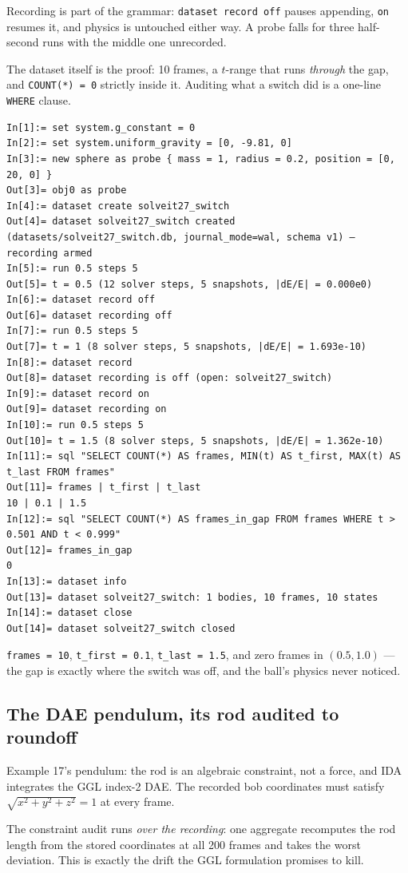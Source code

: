 \documentclass[11pt]{article}
\newcommand{\code}[1]{\texttt{#1}}
\begin{document}
Recording is part of the grammar: \code{dataset record off} pauses
appending, \code{on} resumes it, and physics is untouched either way.
A probe falls for three half-second runs with the middle one
unrecorded.

The dataset itself is the proof: 10 frames, a $t$-range that runs
\emph{through} the gap, and \code{COUNT(*) = 0} strictly inside it.
Auditing what a switch did is a one-line \code{WHERE} clause.

\begin{lstlisting}
In[1]:= set system.g_constant = 0
In[2]:= set system.uniform_gravity = [0, -9.81, 0]
In[3]:= new sphere as probe { mass = 1, radius = 0.2, position = [0, 20, 0] }
Out[3]= obj0 as probe
In[4]:= dataset create solveit27_switch
Out[4]= dataset solveit27_switch created (datasets/solveit27_switch.db, journal_mode=wal, schema v1) — recording armed
In[5]:= run 0.5 steps 5
Out[5]= t = 0.5 (12 solver steps, 5 snapshots, |dE/E| = 0.000e0)
In[6]:= dataset record off
Out[6]= dataset recording off
In[7]:= run 0.5 steps 5
Out[7]= t = 1 (8 solver steps, 5 snapshots, |dE/E| = 1.693e-10)
In[8]:= dataset record
Out[8]= dataset recording is off (open: solveit27_switch)
In[9]:= dataset record on
Out[9]= dataset recording on
In[10]:= run 0.5 steps 5
Out[10]= t = 1.5 (8 solver steps, 5 snapshots, |dE/E| = 1.362e-10)
In[11]:= sql "SELECT COUNT(*) AS frames, MIN(t) AS t_first, MAX(t) AS t_last FROM frames"
Out[11]= frames | t_first | t_last
10 | 0.1 | 1.5
In[12]:= sql "SELECT COUNT(*) AS frames_in_gap FROM frames WHERE t > 0.501 AND t < 0.999"
Out[12]= frames_in_gap
0
In[13]:= dataset info
Out[13]= dataset solveit27_switch: 1 bodies, 10 frames, 10 states
In[14]:= dataset close
Out[14]= dataset solveit27_switch closed
\end{lstlisting}

\code{frames = 10}, \code{t\_first = 0.1}, \code{t\_last = 1.5}, and
zero frames in $(0.5, 1.0)$ --- the gap is exactly where the switch
was off, and the ball's physics never noticed.

\subsection{The DAE pendulum, its rod audited to roundoff}

Example 17's pendulum: the rod is an algebraic constraint, not a
force, and IDA integrates the GGL index-2 DAE. The recorded bob
coordinates must satisfy $\sqrt{x^2+y^2+z^2} = 1$ at every frame.

The constraint audit runs \emph{over the recording}: one aggregate
recomputes the rod length from the stored coordinates at all 200
frames and takes the worst deviation. This is exactly the drift the
GGL formulation promises to kill.
\end{document}
